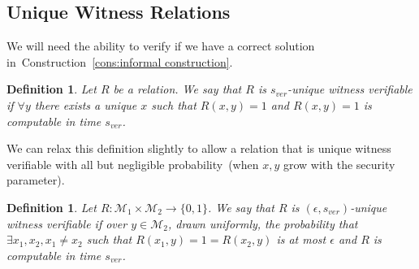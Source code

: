 \documentclass[11pt]{article}
\newcommand{\consref}[1]{\mbox{Construction~\ref{#1}}}
\newcommand{\zo}{\ensuremath{\{0, 1\}}}
\newtheorem{definition}[theorem]{Definition}
\begin{document}
\subsection{Unique Witness Relations}

We will need the ability to verify if we have a correct solution in~\consref{cons:informal construction}.  

\begin{definition}
Let $R$ be a relation.  We say that $R$ is $s_{ver}$-\emph{unique witness verifiable} if $\forall y$ there exists a unique $x$ such that $R(x, y)=1$ and $R(x, y) =1$ is computable in time $s_{ver}$.
\end{definition}
We can relax this definition slightly to allow a relation that is unique witness verifiable with all but negligible probability~(when $x, y$ grow with the security parameter).

\begin{definition}
\label{def:unique witness relation}
Let $R:\mathcal{M}_1\times \mathcal{M}_2\rightarrow \zo$.  We say that $R$ is $(\epsilon, s_{ver})$-\emph{unique witness verifiable} if over $y\in \mathcal{M}_2$, drawn uniformly, the probability that $\exists x_1, x_2, x_1\neq x_2$ such that $R(x_1, y) =1 = R(x_2, y)$ is at most $\epsilon$ and $R$ is computable in time $s_{ver}$.
\end{definition}
\end{document}
